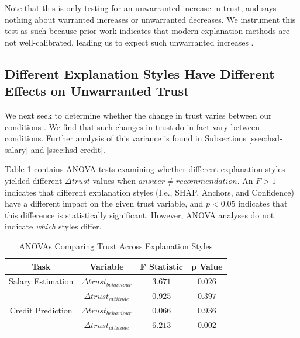 Note that this is only testing for an unwarranted increase in trust, and says nothing about warranted increases or unwarranted decreases. We instrument this test as such because prior work indicates that modern explanation methods are not well-calibrated, leading us to expect such unwarranted increases \cite{miller_explainable_2023}.

\subsection{Different Explanation Styles Have Different Effects on Unwarranted Trust}\label{ssec:anovas}
We next seek to determine whether the change in trust varies between our conditions \cite{natarajan_binns_2022}. We find that such changes in trust do in fact vary between conditions. Further analysis of this variance is found in Subsections \ref{ssec:hsd-salary} and \ref{ssec:hsd-credit}.

Table \ref{tab:delta-trust-anova} contains ANOVA tests examining whether different explanation styles yielded different $\Delta trust$ values when $answer \neq recommendation$. An $F>1$ indicates that different explanation styles (I.e., SHAP, Anchors, and Confidence) have a different impact on the given trust variable, and $p<0.05$ indicates that this difference is statistically significant. However, ANOVA analyses do not indicate \emph{which} styles differ.

\begin{table}[htbp]
    \caption{ANOVAs Comparing Trust Across Explanation Styles}
    \begin{center}
    \begin{tabular}{cccc}
        \toprule
        Task & Variable & F Statistic & p Value \\
        \midrule
        Salary Estimation & $\Delta trust_{behaviour}$ & $\mathbf{3.671}$ & $\mathbf{0.026}$ \\
        & $\Delta trust_{attitude}$ & $0.925$ & $0.397$ \\
        \midrule
        Credit Prediction & $\Delta trust_{behaviour}$ & $0.066$ & $0.936$ \\
        & $\Delta trust_{attitude}$ & $\mathbf{6.213}$ & $\mathbf{0.002}$ \\
        \bottomrule
    \end{tabular}
    \label{tab:delta-trust-anova}
    \end{center}
\end{table}

